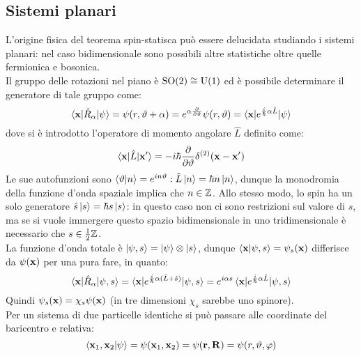 \subsection{Sistemi planari}

L'origine fisica del teorema spin-statisca può essere delucidata studiando i sistemi planari: nel caso bidimensionale sono possibili altre statistiche oltre quelle fermionica e bosonica.\\
Il gruppo delle rotazioni nel piano è $ \mathrm{SO}(2) \cong \mathrm{U}(1) $ ed è possibile determinare il generatore di tale gruppo come:
\begin{equation*}
	\braket{\mathbf{x} | \hat{R}_\alpha | \psi} = \psi(r, \vartheta + \alpha) = e^{\alpha \frac{\partial}{\partial \vartheta}} \psi(r, \vartheta) = \braket{\mathbf{x} | e^{\frac{i}{\hbar} \alpha \hat{L}} | \psi}
\end{equation*}
dove si è introdotto l'operatore di momento angolare $ \hat{L} $ definito come:
\begin{equation*}
	\braket{\mathbf{x} | \hat{L} | \mathbf{x}'} = - i \hbar \frac{\partial}{\partial \vartheta} \delta^{(2)}(\mathbf{x} - \mathbf{x}')
\end{equation*}
Le sue autofunzioni sono $ \braket{\vartheta | n} = e^{in \vartheta} : \hat{L} \ket{n} = \hbar n \ket{n} $, dunque la monodromia della funzione d'onda spaziale implica che $ n \in \mathbb{Z} $. Allo stesso modo, lo spin ha un solo generatore $ \hat{s} \ket{s} = \hbar s \ket{s} $: in questo caso non ci sono restrizioni sul valore di $ s $, ma se si vuole immergere questo spazio bidimensionale in uno tridimensionale è necessario che $ s \in \frac{1}{2} \mathbb{Z} $.\\
La funzione d'onda totale è $ \ket{\psi,s} = \ket{\psi} \otimes \ket{s} $, dunque $ \braket{\mathbf{x} | \psi, s} = \psi_s(\mathbf{x}) $ differisce da $ \psi(\mathbf{x}) $ per una pura fare, in quanto:
\begin{equation*}
	\braket{\mathbf{x} | \hat{R}_\alpha | \psi,s} = \braket{\mathbf{x} | e^{\frac{i}{\hbar} \alpha (\hat{L} + \hat{s})} | \psi,s} = e^{i \alpha s} \braket{\mathbf{x} | e^{\frac{i}{\hbar} \alpha \hat{L}} | \psi,s}
\end{equation*}
Quindi $ \psi_s(\mathbf{x}) = \chi_s \psi(\mathbf{x}) $ (in tre dimensioni $ \chi_s $ sarebbe uno spinore).\\
Per un sistema di due particelle identiche si può passare alle coordinate del baricentro e relativa:
\begin{equation*}
	\braket{\mathbf{x}_1, \mathbf{x}_2 | \psi} = \psi(\mathbf{x}_1, \mathbf{x}_2) = \psi(\mathbf{r},\mathbf{R}) = \psi(r, \vartheta, \varphi)
\end{equation*}
